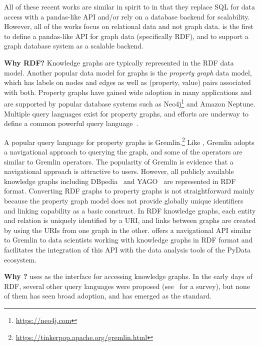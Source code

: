 All of these recent works are similar in spirit to
\rdfframes in that they replace SQL for data access with a pandas-like API and/or rely on a database backend for scalability. However, all of the works focus on relational data and not graph data.
\rdfframes is the first to define a pandas-like API for graph data (specifically RDF),
and to support a graph database system as a scalable backend.

\vspace{4pt}
\noindent
\textbf{Why RDF?}
Knowledge graphs are typically represented in the RDF data model.
Another popular data model for graphs is the \textit{property graph} data model,
which has labels on nodes and edges as well as (property, value) pairs associated with both.
Property graphs have gained wide adoption in many applications and are supported by popular database systems such as Neo4j\footnote{\url{https://neo4j.com}}
and Amazon Neptune.
Multiple query languages exist for property graphs, and efforts are underway to define a common powerful query language~\cite{g-core}.

A popular query language for property graphs is Gremlin.\footnote{\url{https://tinkerpop.apache.org/gremlin.html}}
Like \rdfframes, Gremlin adopts a navigational approach to querying the graph,
and some of the \rdfframes operators are similar to Gremlin operators.
The popularity of Gremlin is evidence that a navigational approach is attractive to users.
However, all publicly available knowledge graphs including DBpedia~\cite{lehmann2015dbpedia} and YAGO~\cite{yago} are represented in RDF format. Converting RDF graphs to property graphs is not straightforward mainly because the property graph model does not provide globally unique identifiers and linking capability as a basic construct. 
In RDF knowledge graphs, each entity and relation is uniquely identified by a URI, and links between graphs are created by using the URIs from one graph in the other.
\rdfframes offers a navigational API similar to Gremlin to data scientists working with knowledge graphs in RDF format and facilitates the integration of this API with the data analysis tools of the PyData ecosystem. 

\vspace{4pt}
\noindent
\textbf{Why \sparql?}
\rdfframes uses \sparql as the interface for accessing knowledge graphs.
In the early days of RDF, several other query languages were proposed
(see~\cite{haase2004rdfquerylanguages} for a survey), but none of them has seen broad adoption, and \sparql has emerged as the standard.

